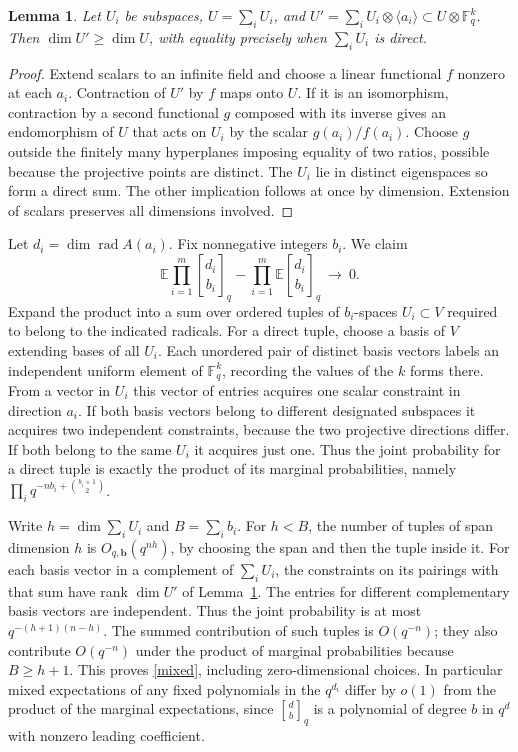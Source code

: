 \documentclass[11pt]{article}
\newtheorem{lemma}[theorem]{Lemma}
\newcommand{\F}{\mathbb F}
\newcommand{\E}{\mathbb E}
\newcommand{\radic}{\operatorname{rad}}
\newcommand{\gb}[2]{\genfrac{[}{]}{0pt}{}{#1}{#2}_{q}}
\begin{document}
\begin{lemma}\label{tensor}
Let $U_i$ be subspaces, $U=\sum_i U_i$, and $U'=\sum_i U_i\otimes\langle a_i\rangle\subset U\otimes\F_q^k$. Then $\dim U'\ge\dim U$, with equality precisely when $\sum_i U_i$ is direct.
\end{lemma}
\begin{proof}
Extend scalars to an infinite field and choose a linear functional $f$ nonzero at each $a_i$. Contraction of $U'$ by $f$ maps onto $U$. If it is an isomorphism, contraction by a second functional $g$ composed with its inverse gives an endomorphism of $U$ that acts on $U_i$ by the scalar $g(a_i)/f(a_i)$. Choose $g$ outside the finitely many hyperplanes imposing equality of two ratios, possible because the projective points are distinct. The $U_i$ lie in distinct eigenspaces so form a direct sum. The other implication follows at once by dimension. Extension of scalars preserves all dimensions involved.
\end{proof}

Let $d_i=\dim\radic A(a_i)$. Fix nonnegative integers $b_i$. We claim
\begin{equation}\label{mixed}
 \E\prod_{i=1}^m\gb{d_i}{b_i}
  -\prod_{i=1}^m\E\gb{d_i}{b_i}\ \longrightarrow\ 0 .
\end{equation}
Expand the product into a sum over ordered tuples of $b_i$-spaces $U_i\subset V$ required to belong to the indicated radicals. For a direct tuple, choose a basis of $V$ extending bases of all $U_i$. Each unordered pair of distinct basis vectors labels an independent uniform element of $\F_q^k$, recording the values of the $k$ forms there. From a vector in $U_i$ this vector of entries acquires one scalar constraint in direction $a_i$. If both basis vectors belong to different designated subspaces it acquires two independent constraints, because the two projective directions differ. If both belong to the same $U_i$ it acquires just one. Thus the joint probability for a direct tuple is exactly the product of its marginal probabilities, namely $\prod_i q^{-nb_i+\binom{b_i+1}2}$.

Write $h=\dim\sum_i U_i$ and $B=\sum_i b_i$. For $h<B$, the number of tuples of span dimension $h$ is $O_{q,\mathbf b}(q^{nh})$, by choosing the span and then the tuple inside it. For each basis vector in a complement of $\sum_iU_i$, the constraints on its pairings with that sum have rank $\dim U'$ of Lemma~\ref{tensor}. The entries for different complementary basis vectors are independent. Thus the joint probability is at most $q^{-(h+1)(n-h)}$. The summed contribution of such tuples is $O(q^{-n})$; they also contribute $O(q^{-n})$ under the product of marginal probabilities because $B\ge h+1$. This proves \eqref{mixed}, including zero-dimensional choices. In particular mixed expectations of any fixed polynomials in the $q^{d_i}$ differ by $o(1)$ from the product of the marginal expectations, since $\gb db$ is a polynomial of degree $b$ in $q^d$ with nonzero leading coefficient.
\end{document}
